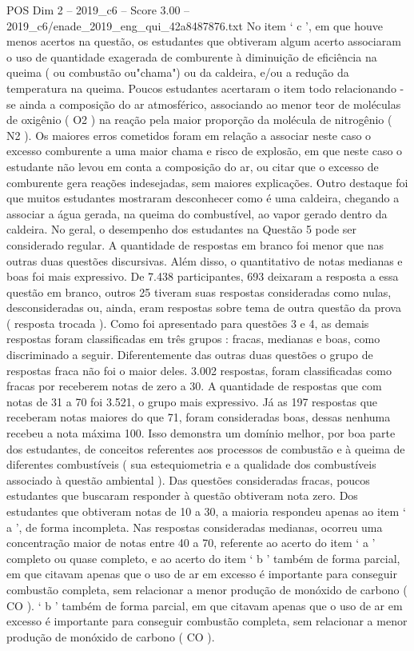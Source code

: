 \begin{textsample}{POS Dim 2 – 2019\_c6 – Score 3.00 – 2019\_c6/enade\_2019\_eng\_qui\_42a8487876.txt}
No item ‘ c ’, em que houve menos acertos na questão, os estudantes que obtiveram algum acerto associaram o uso de quantidade exagerada de comburente à diminuição de eficiência na queima ( ou combustão ou"chama") ou da caldeira, e/ou a redução da temperatura na queima.
Poucos estudantes acertaram o item todo relacionando -se ainda a composição do ar atmosférico, associando ao menor teor de moléculas de oxigênio ( O2 ) na reação pela maior proporção da molécula de nitrogênio ( N2 ).
Os maiores erros cometidos foram em relação a associar neste caso o excesso comburente a uma maior chama e risco de explosão, em que neste caso o estudante não levou em conta a composição do ar, ou citar que o excesso de comburente gera reações indesejadas, sem maiores explicações.
Outro destaque foi que muitos estudantes mostraram desconhecer como é uma caldeira, chegando a associar a água gerada, na queima do combustível, ao vapor gerado dentro da caldeira.
No geral, o desempenho dos estudantes na Questão 5 pode ser considerado regular.
A quantidade de respostas em branco foi menor que nas outras duas questões discursivas.
Além disso, o quantitativo de notas medianas e boas foi mais expressivo.
De 7.438 participantes, 693 deixaram a resposta a essa questão em branco, outros 25 tiveram suas respostas consideradas como nulas, desconsideradas ou, ainda, eram respostas sobre tema de outra questão da prova ( resposta trocada ).
Como foi apresentado para questões 3 e 4, as demais respostas foram classificadas em três grupos : fracas, medianas e boas, como discriminado a seguir.
Diferentemente das outras duas questões o grupo de respostas fraca não foi o maior deles. 3.002 respostas, foram classificadas como fracas por receberem notas de zero a 30.
A quantidade de respostas que com notas de 31 a 70 foi 3.521, o grupo mais expressivo.
Já as 197 respostas que receberam notas maiores do que 71, foram consideradas boas, dessas nenhuma recebeu a nota máxima 100.
Isso demonstra um domínio melhor, por boa parte dos estudantes, de conceitos referentes aos processos de combustão e à queima de diferentes combustíveis ( sua estequiometria e a qualidade dos combustíveis associado à questão ambiental ).
Das questões consideradas fracas, poucos estudantes que buscaram responder à questão obtiveram nota zero.
Dos estudantes que obtiveram notas de 10 a 30, a maioria respondeu apenas ao item ‘ a ’, de forma incompleta.
Nas respostas consideradas medianas, ocorreu uma concentração maior de notas entre 40 a 70, referente ao acerto do item ‘ a ’ completo ou quase completo, e ao acerto do item ‘ b ’ também de forma parcial, em que citavam apenas que o uso de ar em excesso é importante para conseguir combustão completa, sem relacionar a menor produção de monóxido de carbono ( CO ). ‘ b ’ também de forma parcial, em que citavam apenas que o uso de ar em excesso é importante para conseguir combustão completa, sem relacionar a menor produção de monóxido de carbono ( CO ).

\end{textsample}
